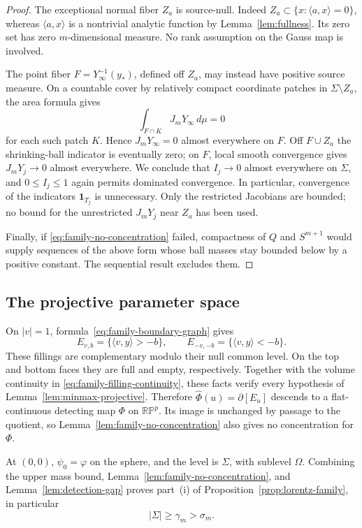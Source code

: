 \begin{proof}
The exceptional normal fiber $Z_a$ is source-null.
Indeed $Z_a\subset\{x:\langle a,x\rangle=0\}$, whereas
$\langle a,x\rangle$ is a nontrivial analytic function by
Lemma~\ref{lem:fullness}.  Its zero set has zero $m$-dimensional
measure.  No rank assumption on the Gauss map is involved.

The point fiber $F=Y_\infty^{-1}(y_*)$, defined off $Z_a$, may instead
have positive source measure.  On a countable cover by relatively
compact coordinate patches in $\Sigma\setminus Z_a$, the area formula
gives
\[
 \int_{F\cap K}J_mY_\infty\,d\mu=0
\]
for each such patch $K$.  Hence $J_mY_\infty=0$ almost everywhere on
$F$.  Off $F\cup Z_a$ the shrinking-ball indicator is eventually
zero; on $F$, local smooth convergence gives $J_mY_j\to0$ almost
everywhere.  We conclude that $I_j\to0$ almost everywhere on
$\Sigma$, and $0\le I_j\le1$ again permits dominated convergence.
In particular, convergence of the indicators $\mathbf1_{T_j}$ is
unnecessary.  Only the restricted Jacobians are bounded; no bound for
the unrestricted $J_mY_j$ near $Z_a$ has been used.

Finally, if \eqref{eq:family-no-concentration} failed, compactness of
$Q$ and $S^{m+1}$ would supply sequences of the above form whose ball
masses stay bounded below by a positive constant.  The sequential
result excludes them.
\end{proof}

\subsection{The projective parameter space}

On $|v|=1$, formula~\eqref{eq:family-boundary-graph} gives
\[
 E_{v,b}=\{\langle v,y\rangle>-b\},\qquad
 E_{-v,-b}=\{\langle v,y\rangle<-b\}.
\]
These fillings are complementary modulo their null common level.
On the top and bottom faces they are full and empty, respectively.
Together with the volume continuity in
\eqref{eq:family-filling-continuity}, these facts verify every
hypothesis of Lemma~\ref{lem:minmax-projective}. Therefore
$\widehat\Phi(u)=\partial[E_u]$ descends to a flat-continuous detecting
map $\Phi$ on $\mathbb {RP}^{p}$. Its image is unchanged by passage to
the quotient, so Lemma~\ref{lem:family-no-concentration} also gives no
concentration for $\Phi$.

At $(0,0)$, $\psi_0=\varphi$ on the sphere, and the level is
$\Sigma$, with sublevel $\Omega$.  Combining the upper mass bound,
Lemma~\ref{lem:family-no-concentration}, and
Lemma~\ref{lem:detection-gap} proves part~\textup{(i)} of
Proposition~\ref{prop:lorentz-family}, in particular
\begin{equation}\label{eq:family-gap}
 |\Sigma|\ge\gamma_m>\sigma_m.
\end{equation}

